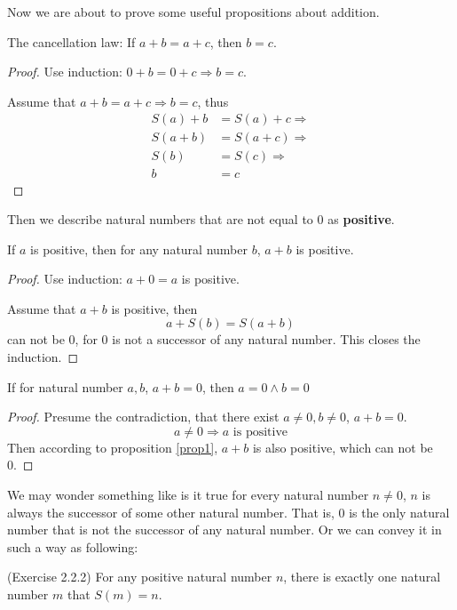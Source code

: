 Now we are about to prove some useful propositions about addition.

\begin{prop}
The cancellation law: If $a+b=a+c$, then $b=c$.
\end{prop}
\begin{proof}
Use induction: $0+b=0+c \Rightarrow b=c$.

Assume that $a+b=a+c \Rightarrow b=c$, thus 
\begin{align*}
S(a)+b &= S(a)+c \Rightarrow \\
S(a+b) &= S(a+c) \Rightarrow \\
S(b) &= S(c) \Rightarrow \\
b &= c
\end{align*}
\end{proof}

Then we describe natural numbers that are not equal to 0 as \textbf{positive}. 

\begin{prop}
If $a$ is positive, then for any natural number $b$, $a+b$ is positive. \label{prop1}
\end{prop}
\begin{proof}
Use induction: $a+0=a$ is positive.

Assume that $a+b$ is positive, then 
\[
a+S(b) = S(a+b)
\]
can not be 0, for 0 is not a successor of any natural number. This closes the induction. \qedhere
\end{proof}

\begin{coro}
If for natural number $a,b$, $a+b=0$, then $a=0 \wedge b=0$ \label{coro1}
\end{coro}
\begin{proof}
Presume the contradiction, that there exist $a \neq 0, b \neq 0$, $a+b=0$. 
\[
a \neq 0 \Rightarrow a \text{ is positive}
\]
Then according to proposition \ref{prop1}, $a+b$ is also positive, which can not be 0. \qedhere
\end{proof}

We may wonder something like is it true for every natural number $n \neq 0$, $n$ is always the 
successor of some other natural number. That is, 0 is the only natural number that is not the successor 
of any natural number. Or we can convey it in such a way as following: 
\begin{prop}
(Exercise 2.2.2) \label{exercise2.2.2}
For any positive natural number $n$, there is exactly one natural number $m$ that $S(m) = n$. 
\label{prop5}
\end{prop} 

